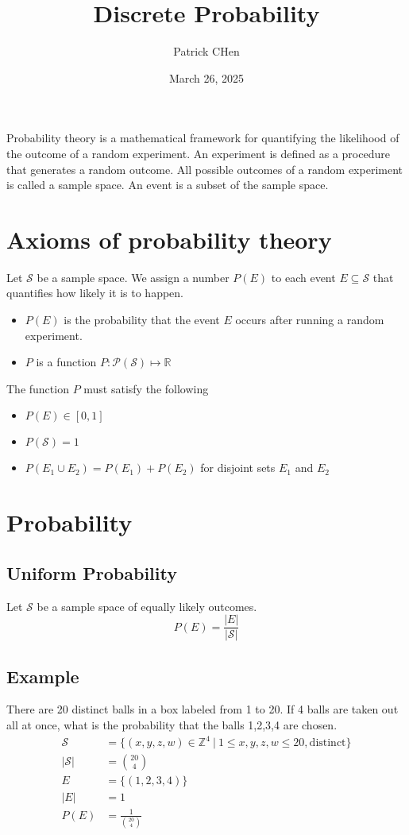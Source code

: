 \documentclass{article}
\title{Discrete Probability}
\author{Patrick CHen}
\date{March 26, 2025}
\theoremstyle{mytheoremstyle}
\theoremstyle{mytheoremstyle}
\theoremstyle{myproblemstyle}
\begin{document}
    \maketitle
    Probability theory is a mathematical framework for quantifying the
    likelihood of the outcome of a random experiment. An experiment is defined
    as a procedure that generates a random outcome. All possible outcomes of a
    random experiment is called a sample space. An event is a subset of the
    sample space.

    \section*{Axioms of probability theory}
    Let $\mathcal{S}$ be a sample space. We assign a number $P(E)$ to each event
    $E\subseteq \mathcal{S}$ that quantifies how likely it is to happen.
    \begin{itemize}
        \item $P(E)$ is the probability that the event $E$ occurs after running
            a random experiment.
        \item $P$ is a function $P: \mathcal{P}(\mathcal{S}) \mapsto \mathbb{R}$
    \end{itemize}
    The function $P$ must satisfy the following
    \begin{itemize}
        \item $P(E) \in [0,1]$
        \item $P(\mathcal{S}) = 1$
        \item $P(E_1\cup E_2) = P(E_1) + P(E_2)$ for disjoint sets $E_1$ and
            $E_2$
    \end{itemize}

    \section*{Probability}
    \subsection*{Uniform Probability}
    Let $\mathcal{S}$ be a sample space of equally likely outcomes.
    \[
        P(E) = \frac{|E|}{|\mathcal{S}|}
    \]

    \subsection*{Example}
    There are 20 distinct balls in a box labeled from 1 to 20. If 4 balls are
    taken out all at once, what is the probability that the balls 1,2,3,4
    are chosen.
    \begin{align*}
        \mathcal{S} &= \{ (x,y,z,w)\in \mathbb{Z}^4\ |\ 1\le x,y,z,w\le 20, \text{distinct}\} \\
        |\mathcal{S}| &= \binom{20}{4} \\
        E &= \{(1,2,3,4)\} \\
        |E| &= 1 \\
        P(E) &= \frac{1}{\binom{20}{4}}
    \end{align*}
\end{document}
